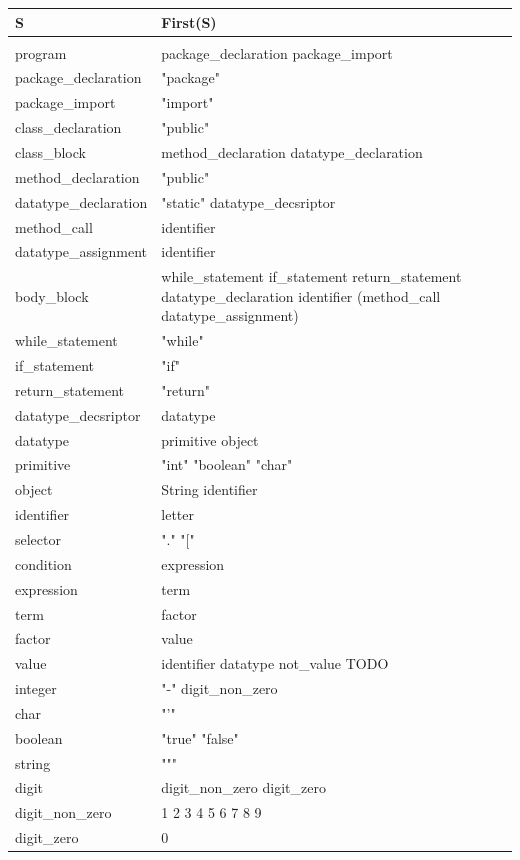 \begin{tabular}{p{4cm}l}
	S & First(S) \\ \hline
	& \\
	program & package\_declaration package\_import  \\
	package\_declaration & "package" \\
	package\_import & "import" \\
	class\_declaration & "public" \\
	class\_block & method\_declaration datatype\_declaration \\
	method\_declaration & "public" \\
	datatype\_declaration & "static" datatype\_decsriptor \\
	method\_call & identifier \\
	datatype\_assignment & identifier \\
	body\_block & while\_statement if\_statement return\_statement datatype\_declaration identifier (method\_call datatype\_assignment) \\
	while\_statement & "while" \\
	if\_statement & "if" \\
	return\_statement & "return" \\
	datatype\_decsriptor & datatype \\
	datatype & primitive object \\
	primitive & "int" "boolean" "char" \\
	object & String identifier \\
	identifier & letter \\
	selector & "." "[" \\
	condition & expression \\
	expression & term \\
	term & factor \\
	factor & value \\
	value & identifier datatype not\_value TODO \\
	integer & "-" digit\_non\_zero \\
	char & "'"\\
	boolean & "true" "false" \\
	string & """ \\
	digit & digit\_non\_zero digit\_zero \\
	digit\_non\_zero & 1 2 3 4 5 6 7 8 9 \\
	digit\_zero & 0 \\
\end{tabular}


